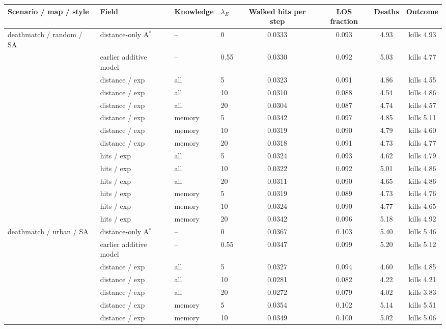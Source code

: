 \begin{tabular}{llllcccc}
\toprule
Scenario / map / style & Field & Knowledge & $\lambda_E$ & Walked hits per step & LOS fraction & Deaths & Outcome \\
\midrule
deathmatch / random / SA & distance-only A$^*$ & -- & 0 & 0.0333 & 0.093 & 4.93 & kills 4.93 \\
 & earlier additive model & -- & 0.55 & 0.0330 & 0.092 & 5.03 & kills 4.77 \\
 & distance / exp & all & 5 & 0.0323 & 0.091 & 4.86 & kills 4.55 \\
 & distance / exp & all & 10 & 0.0310 & 0.088 & 4.54 & kills 4.86 \\
 & distance / exp & all & 20 & 0.0304 & 0.087 & 4.74 & kills 4.57 \\
 & distance / exp & memory & 5 & 0.0342 & 0.097 & 4.85 & kills 5.11 \\
 & distance / exp & memory & 10 & 0.0319 & 0.090 & 4.79 & kills 4.60 \\
 & distance / exp & memory & 20 & 0.0318 & 0.091 & 4.73 & kills 4.77 \\
 & hits / exp & all & 5 & 0.0324 & 0.093 & 4.62 & kills 4.79 \\
 & hits / exp & all & 10 & 0.0322 & 0.092 & 5.01 & kills 4.86 \\
 & hits / exp & all & 20 & 0.0311 & 0.090 & 4.65 & kills 4.86 \\
 & hits / exp & memory & 5 & 0.0319 & 0.089 & 4.73 & kills 4.76 \\
 & hits / exp & memory & 10 & 0.0324 & 0.090 & 4.77 & kills 4.65 \\
 & hits / exp & memory & 20 & 0.0342 & 0.096 & 5.18 & kills 4.92 \\
\midrule
deathmatch / urban / SA & distance-only A$^*$ & -- & 0 & 0.0367 & 0.103 & 5.40 & kills 5.46 \\
 & earlier additive model & -- & 0.55 & 0.0347 & 0.099 & 5.20 & kills 5.12 \\
 & distance / exp & all & 5 & 0.0327 & 0.094 & 4.60 & kills 4.85 \\
 & distance / exp & all & 10 & 0.0281 & 0.082 & 4.22 & kills 4.21 \\
 & distance / exp & all & 20 & 0.0272 & 0.079 & 4.02 & kills 3.83 \\
 & distance / exp & memory & 5 & 0.0354 & 0.102 & 5.14 & kills 5.51 \\
 & distance / exp & memory & 10 & 0.0349 & 0.100 & 5.02 & kills 5.06 \\

\end{tabular}
